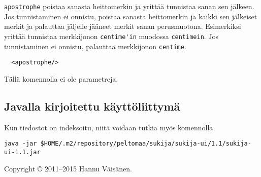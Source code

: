 \documentclass[12pt]{article}
\begin{document}
\bigskip

\verb=apostrophe= poistaa sanasta heittomerkin ja yrittää tunnistaa
sanan sen jälkeen. Jos tunnistaminen ei onnistu, poistaa sanasta
heittomerkin ja kaikki sen jälkeiset merkit ja palauttaa jäljelle
jääneet merkit sanan perusmuotona. Esimerkiksi yrittää tunnistaa
merkkijonon \verb=centime'in= muodossa \verb=centimein=. Jos
tunnistaminen ei onnistu, palauttaa merkkijonon \verb=centime=.


\begin{verbatim}
  <apostrophe/>
\end{verbatim}

Tällä komennolla ei ole parametreja.


\subsection*{Javalla kirjoitettu käyttöliittymä}

Kun tiedostot on indeksoitu, niitä voidaan tutkia myös komennolla

{\footnotesize
\verb|java -jar $HOME/.m2/repository/peltomaa/sukija/sukija-ui/1.1/sukija-ui-1.1.jar|
}

\bigskip \noindent \noindent
Copyright © 2011--2015 Hannu Väisänen.
\end{document}
